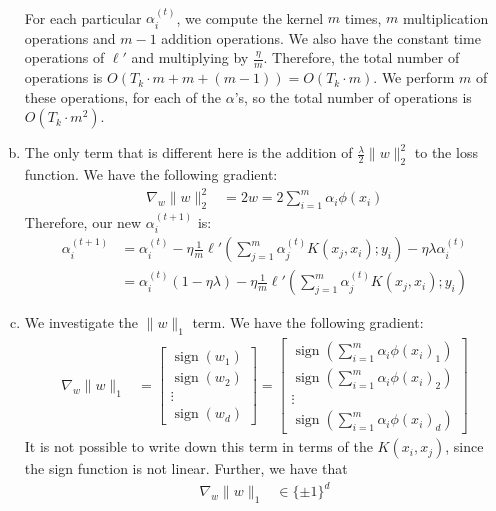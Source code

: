 \documentclass{amsart}
\DeclareMathOperator{\sign}{sign}
\theoremstyle{definition}
\begin{document}
\begin{enumerate}[(a)]
\begin{align*}
    \end{align*}
    For each particular $\alpha^{(t)}_i$, we compute the kernel $m$ times, $m$ multiplication operations and $m-1$ addition operations. 
    We also have the constant time operations of $\ell'$ and multiplying by $\frac{\eta}{m}$. 
    Therefore, the total number of operations is $O(T_k \cdot m + m + (m-1)) = O(T_k \cdot m)$. 
    We perform $m$ of these operations, for each of the $\alpha$'s, so the total number of operations is $O(T_k \cdot m^2)$.
  \item 
    The only term that is different here is the addition of 
    $\frac{\lambda}2 \|w\|_2^2$ to the loss function. We have the following gradient:
    \begin{align*}
      \nabla_w \|w\|_2^2 &= 2w = 2 \sum_{i=1}^{m} \alpha_i \phi(x_i)
    \end{align*}
    Therefore, our new $\alpha_{i}^{(t+1)}$ is:
    \begin{align*}
      \alpha_i^{(t+1)} &= \alpha_i^{(t)} - \eta \frac{1}{m} \ell'\left(\sum_{j=1}^{m} \alpha_j^{(t)} K(x_j, x_i); y_i\right) - \eta \lambda \alpha_i^{(t)}\\
      &= \alpha_i^{(t)}(1 - \eta \lambda) - \eta \frac{1}{m} \ell'\left(\sum_{j=1}^{m} \alpha_j^{(t)} K(x_j, x_i); y_i\right)
    \end{align*}
  \item 
    We investigate the $\|w\|_1$ term. We have the following gradient:
    \begin{align*}
      \nabla_w \|w\|_1 &= \begin{bmatrix}
        \sign(w_1)\\
        \sign(w_2)\\
        \vdots\\
        \sign(w_d)
      \end{bmatrix} = \begin{bmatrix}
        \sign(\sum_{i=1}^{m} \alpha_i \phi(x_i)_1)\\
        \sign(\sum_{i=1}^{m} \alpha_i \phi(x_i)_2)\\
        \vdots\\
        \sign(\sum_{i=1}^{m} \alpha_i \phi(x_i)_d)
      \end{bmatrix}
    \end{align*}
    It is not possible to write down this term in terms of the $K(x_i, x_j)$, since the sign function is not linear.
    Further, we have that 
    \begin{align*}
      \nabla_w \|w\|_1 &\in \{\pm 1\}^d

\end{align*}
\end{enumerate}
\end{document}
